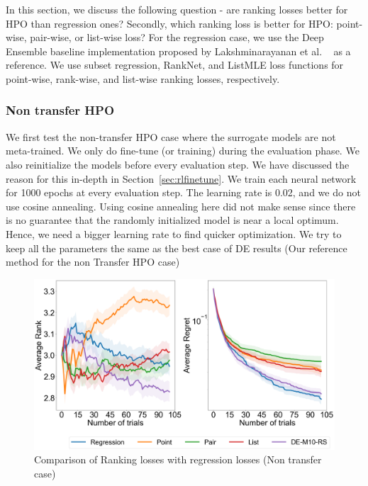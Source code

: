 \documentclass[12pt, twoside, ngerman]{report}
\begin{document}
In this section, we discuss the following question - are ranking losses better for HPO than regression ones? Secondly, which ranking loss is better for HPO: point-wise,  pair-wise, or list-wise loss?
For the regression case,  we use the Deep Ensemble baseline implementation proposed by Lakshminarayanan et al. ~\cite{DeepEnsemblePaper} as a reference. We use subset regression,  RankNet, and ListMLE loss functions for point-wise, rank-wise, and list-wise ranking losses, respectively. 

\subsubsection{Non transfer HPO}
We first test the non-transfer HPO case where the surrogate models are not meta-trained. We only do fine-tune (or training) during the evaluation phase. We also reinitialize the models before every evaluation step. We have discussed the reason for this in-depth in Section~\ref{sec:rlfinetune}.
We train each neural network for 1000 epochs at every evaluation step. The learning rate is 0.02, and we do not use cosine annealing.
Using cosine annealing here did not make sense since there is no guarantee that the randomly initialized model is near a local optimum.
Hence, we need a bigger learning rate to find quicker optimization.
We try to keep all the parameters the same as the best case of DE results (Our reference method for the non Transfer HPO case)

\begin{figure}[h]
  \centering
    \includegraphics[scale=0.25]{images/Q1AblationNonTransfer}
    \caption{Comparison of Ranking losses with regression losses (Non transfer case)}
    \label{fig:Q1AblationNonTransfer}
\end{figure}
\end{document}
